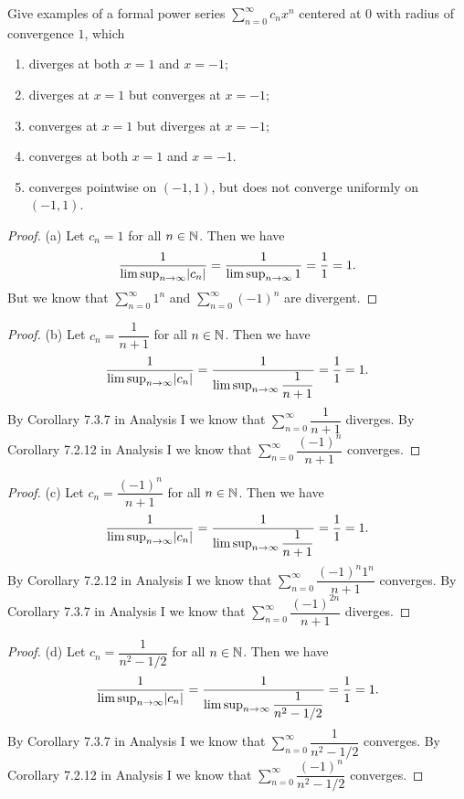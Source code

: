 \begin{ex}\label{ii:ex:4.1.2}
  Give examples of a formal power series \(\sum_{n = 0}^\infty c_n x^n\) centered at \(0\) with radius of convergence \(1\), which
  \begin{enumerate}
    \item diverges at both \(x = 1\) and \(x = -1\);
    \item diverges at \(x = 1\) but converges at \(x = -1\);
    \item converges at \(x = 1\) but diverges at \(x = -1\);
    \item converges at both \(x = 1\) and \(x = -1\).
    \item converges pointwise on \((-1, 1)\), but does not converge uniformly on \((-1, 1)\).
  \end{enumerate}
\end{ex}

\begin{proof}{(a)}
  Let \(c_n = 1\) for all \(n \in \mathbb{N}\).
  Then we have
  \[
    \dfrac{1}{\limsup_{n \to \infty} \abs{c_n}} = \dfrac{1}{\limsup_{n \to \infty} 1} = \dfrac{1}{1} = 1.
  \]
  But we know that \(\sum_{n = 0}^\infty 1^n\) and \(\sum_{n = 0}^\infty (-1)^n\) are divergent.
\end{proof}

\begin{proof}{(b)}
  Let \(c_n = \dfrac{1}{n + 1}\) for all \(n \in \mathbb{N}\).
  Then we have
  \[
    \dfrac{1}{\limsup_{n \to \infty} \abs{c_n}} = \dfrac{1}{\limsup_{n \to \infty} \dfrac{1}{n + 1}} = \dfrac{1}{1} = 1.
  \]
  By Corollary 7.3.7 in Analysis I we know that \(\sum_{n = 0}^\infty \dfrac{1}{n + 1}\) diverges.
  By Corollary 7.2.12 in Analysis I we know that \(\sum_{n = 0}^\infty \dfrac{(-1)^n}{n + 1}\) converges.
\end{proof}

\begin{proof}{(c)}
  Let \(c_n = \dfrac{(-1)^n}{n + 1}\) for all \(n \in \mathbb{N}\).
  Then we have
  \[
    \dfrac{1}{\limsup_{n \to \infty} \abs{c_n}} = \dfrac{1}{\limsup_{n \to \infty} \dfrac{1}{n + 1}} = \dfrac{1}{1} = 1.
  \]
  By Corollary 7.2.12 in Analysis I we know that \(\sum_{n = 0}^\infty \dfrac{(-1)^n 1^n}{n + 1}\) converges.
  By Corollary 7.3.7 in Analysis I we know that \(\sum_{n = 0}^\infty \dfrac{(-1)^{2n}}{n + 1}\) diverges.
\end{proof}

\begin{proof}{(d)}
  Let \(c_n = \dfrac{1}{n^2 - 1 / 2}\) for all \(n \in \mathbb{N}\).
  Then we have
  \[
    \dfrac{1}{\limsup_{n \to \infty} \abs{c_n}} = \dfrac{1}{\limsup_{n \to \infty} \dfrac{1}{n^2 - 1 / 2}} = \dfrac{1}{1} = 1.
  \]
  By Corollary 7.3.7 in Analysis I we know that \(\sum_{n = 0}^\infty \dfrac{1}{n^2 - 1 / 2}\) converges.
  By Corollary 7.2.12 in Analysis I we know that \(\sum_{n = 0}^\infty \dfrac{(-1)^n}{n^2 - 1 / 2}\) converges.
\end{proof}

